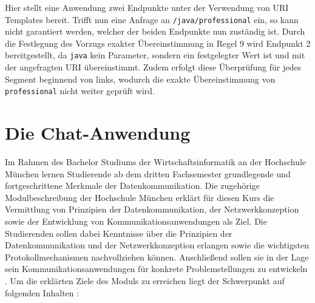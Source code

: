 \documentclass[11pt,a4paper,titlepage]{scrartcl}
\numberwithin{equation}{section}
\begin{document}
\noindent Hier stellt eine Anwendung zwei Endpunkte unter der Verwendung von URI Templates bereit. Trifft nun eine Anfrage an \texttt{/java/professional} ein, so kann nicht garantiert werden, welcher der beiden Endpunkte nun zuständig ist. Durch die Festlegung des Vorzugs exakter Übereinstimmung in Regel 9 wird Endpunkt 2 bereitgestellt, da \texttt{java} kein Parameter, sondern ein festgelegter Wert ist und mit der angefragten URI übereinstimmt. Zudem erfolgt diese Überprüfung für jedes Segment beginnend von links, wodurch die exakte Übereinstimmung von \texttt{professional} nicht weiter geprüft wird.

\newpage
\section{Die Chat-Anwendung}\label{sec:Dako}
Im Rahmen des Bachelor Studiums der Wirtschaftsinformatik an der Hochschule München lernen Studierende ab dem dritten Fachsemester grundlegende und fortgeschrittene Merkmale der Datenkommunikation. Die zugehörige Modulbeschreibung der Hochschule München erklärt für diesen Kurs die Vermittlung von Prinzipien der Datenkommunikation, der Netzwerkkonzeption sowie der Entwicklung von Kommunikationsanwendungen als Ziel. Die Studierenden sollen dabei Kenntnisse über die Prinzipien der Datenkommunikation und der Netzwerkkonzeption erlangen sowie die wichtigsten Protokollmechanismen nachvollziehen können. Anschließend sollen sie in der Lage sein Kommunikationsanwendungen für konkrete Problemstellungen zu entwickeln \autocite[siehe][]{hochschule_munchen_modulhandbuch_2017}. Um die erklärten Ziele des Moduls zu erreichen liegt der Schwerpunkt auf folgenden Inhalten \autocite[aus][]{mandl_datenkommunikation_2017}:

\begin{itemize}
\end{itemize}
\end{document}
